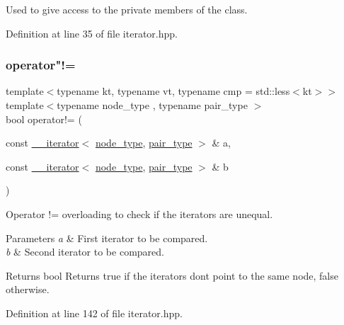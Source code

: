 Used to give access to the private members of the class. 

Definition at line 35 of file iterator.\+hpp.

\mbox{\label{classbst_1_1____iterator_add0144e7693bde5e4b509b5fd8dc5c96}} 
\subsubsection{\texorpdfstring{operator"!=}{operator!=}}
{\footnotesize\ttfamily template$<$typename kt, typename vt, typename cmp = std\+::less$<$kt$>$$>$ \\
template$<$typename node\+\_\+type , typename pair\+\_\+type $>$ \\
bool operator!= (\begin{DoxyParamCaption}\item[{const \hyperlink{classbst_1_1____iterator}{\+\_\+\+\_\+iterator}$<$ \hyperlink{classbst_a062eb2a1ac54802dbc4f0f74ae2afd01}{node\+\_\+type}, \hyperlink{classbst_a7b11cca2a3b4394915600194f741ab16}{pair\+\_\+type} $>$ \&}]{a,  }\item[{const \hyperlink{classbst_1_1____iterator}{\+\_\+\+\_\+iterator}$<$ \hyperlink{classbst_a062eb2a1ac54802dbc4f0f74ae2afd01}{node\+\_\+type}, \hyperlink{classbst_a7b11cca2a3b4394915600194f741ab16}{pair\+\_\+type} $>$ \&}]{b }\end{DoxyParamCaption})\hspace{0.3cm}{\ttfamily [friend]}}



Operator != overloading to check if the iterators are unequal. 


\begin{DoxyParams}{Parameters}
{\em a} & First iterator to be compared. \\
\hline
{\em b} & Second iterator to be compared. \\
\hline
\end{DoxyParams}
\begin{DoxyReturn}{Returns}
bool Returns true if the iterators don\textquotesingle{}t point to the same node, false otherwise. 
\end{DoxyReturn}


Definition at line 142 of file iterator.\+hpp.

